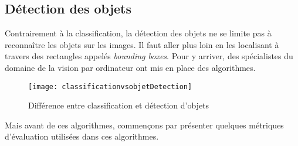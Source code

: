     \subsection{Détection des objets}
    Contrairement à la classification, la détection des objets ne se limite pas à reconnaître les objets sur les images. Il faut aller plus loin en les localisant à travers des rectangles appelés \textit{bounding boxes}. Pour y arriver, des spécialistes du domaine de la vision par ordinateur ont mis en place des algorithmes.
        \begin{figure}[H]
            \centering
            \texttt{[image: classificationvsobjetDetection]}
            \caption{Différence entre classification et détection d'objets}
        \end{figure}
    
    Mais avant de ces algorithmes, commençons par présenter quelques métriques d’évaluation utilisées dans ces algorithmes. 
